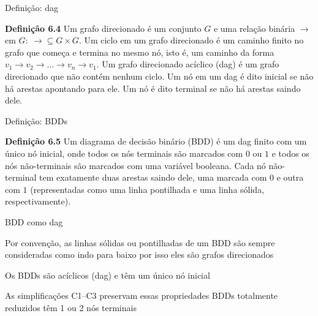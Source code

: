 \expandafter\documentclass\expandafter[table, usenames, svgnames, dvipsnames,14pt, \classopts]{beamer}
\begin{document}
\begin{frame}{Definição: dag}

    \begin{block}{\textbf{Definição 6.4}}
        Um grafo direcionado é um conjunto $\mathit{G}$ e uma relação binária $\rightarrow$ em $\mathit{G}:~\rightarrow \subseteq \mathit{G} \times \mathit{G}$. Um ciclo em um grafo direcionado é um caminho finito no grafo que começa e termina no mesmo nó, isto é, um caminho da forma $v_1 \rightarrow v_2 \rightarrow ... \rightarrow v_n \rightarrow v_1$. Um grafo direcionado acíclico (dag) é um grafo direcionado que não contém nenhum ciclo. Um nó em um dag é dito inicial se não há arestas apontando para ele. Um nó é dito terminal se não há arestas saindo dele.
    \end{block}

\end{frame}

\begin{frame}{Definição: \uppercase{BDD}s}

    \begin{block}{\textbf{Definição 6.5}}
        Um diagrama de decisão binário (BDD) é um dag finito com um único nó inicial, onde todos os nós terminais são marcados com $0$ ou $1$ e todos os nós não-terminais são marcados com uma variável booleana. Cada nó não-terminal tem exatamente duas arestas saindo dele, uma marcada com $0$ e outra com $1$ (representadas como uma linha pontilhada e uma linha sólida, respectivamente).
    \end{block}

\end{frame}

\begin{frame}{\uppercase{BDD} como dag}

    \begin{outline}
        \1 Por convenção, as linhas sólidas ou pontilhadas de um BDD são sempre consideradas como indo para baixo
            \2[-] por isso eles são grafos direcionados
        
        \vspace{1em}
        
        \1 Os BDDs são acíclicos (dag) e têm um único nó inicial

        \vspace{1em}
        
        \1 As simplificações C1--C3 preservam essas propriedades
            \2[-] BDDs totalmente reduzidos têm 1 ou 2 nós terminais
    \end{outline}

\end{frame}
\end{document}
